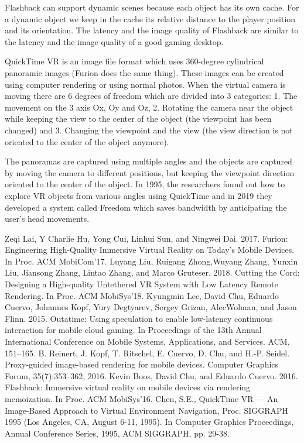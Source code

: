 \documentclass[conference]{IEEEtran}
\begin{document}
Flashback can support dynamic scenes because each object has its own cache. For a dynamic object we keep in the cache its relative distance to the player position and its orientation. The latency and the image quality of Flashback are similar to the latency and the image quality of a good gaming desktop. 

QuickTime VR \cite{b6} is an image file format which uses 360-degree cylindrical panoramic images (Furion does the same thing). These images can be created using computer rendering or using normal photos. When the virtual camera is moving there are 6 degrees of freedom which are divided into 3 categories: 1. The movement on the 3 axis Ox, Oy and Oz, 2. Rotating the camera near the object while keeping the view to the center of the object (the viewpoint has been changed) and 3. Changing the viewpoint and the view (the view direction is not oriented to the center of the object anymore).

The panoramas are captured using multiple angles and the objects are captured by moving the camera to different positions, but keeping the viewpoint direction oriented to the center of the object. In 1995, the researchers found out how to explore VR objects from various angles using QuickTime and in 2019 they developed a system called Freedom which saves bandwidth by anticipating the user's head movements. 

\begin{thebibliography}{00}
 Zeqi Lai, Y Charlie Hu, Yong Cui, Linhui Sun, and Ningwei Dai. 2017. Furion: Engineering High-Quality Immersive Virtual Reality on Today’s Mobile Devices. In Proc. ACM MobiCom’17.
 Luyang Liu, Ruigang Zhong,Wuyang Zhang, Yunxin Liu, Jiansong Zhang, Lintao Zhang, and Marco Gruteser. 2018. Cutting the Cord: Designing a High-quality Untethered VR System with Low Latency Remote Rendering. In Proc. ACM MobiSys’18.
 Kyungmin Lee, David Chu, Eduardo Cuervo, Johannes Kopf, Yury Degtyarev, Sergey Grizan, AlecWolman, and Jason Flinn. 2015. Outatime: Using speculation to enable low-latency continuous interaction for mobile cloud gaming. In Proceedings of the 13th Annual International Conference on Mobile Systems, Applications, and Services. ACM, 151–165.
 B. Reinert, J. Kopf, T. Ritschel, E. Cuervo, D. Chu, and H.-P. Seidel. Proxy-guided image-based rendering for mobile devices. Computer Graphics Forum, 35(7):353–362, 2016.
 Kevin Boos, David Chu, and Eduardo Cuervo. 2016. Flashback: Immersive virtual reality on mobile devices via rendering memoization. In Proc. ACM MobiSys’16.
 Chen, S.E., QuickTime VR — An Image-Based Approach to Virtual Environment Navigation, Proc. SIGGRAPH 1995 (Los Angeles, CA, August 6-11, 1995). In Computer Graphics Proceedings, Annual Conference Series, 1995, ACM SIGGRAPH, pp. 29-38.
\end{thebibliography}
\end{document}

